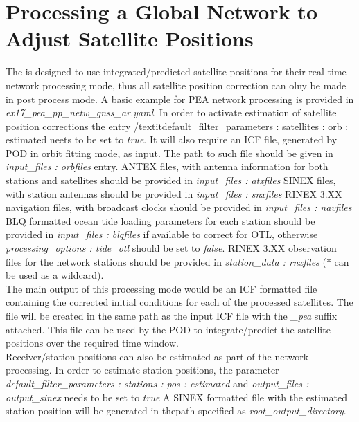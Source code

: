 \section{Processing a Global Network to Adjust Satellite Positions}
The is designed to use integrated/predicted satellite positions for their real-time network  processing mode, thus all satellite position correction can olny be made in post process mode.
A basic example for PEA network processing is provided in  \textit{ex17\_pea\_pp\_netw\_gnss\_ar.yaml}. 
In order to activate estimation of satellite position corrections the entry /textit{default\_filter\_parameters : satellites : orb : estimated} neets to be set to \textit{true}.
It will also require an ICF file, generated by POD in orbit fitting mode, as input. The path to such file should be given in \textit{input\_files : orbfiles} entry.
ANTEX files, with antenna information for both stations and satellites should be provided in  \textit{input\_files : atxfiles} 
SINEX files, with station antennas should be provided in  \textit{input\_files : snxfiles}
RINEX 3.XX navigation files, with broadcast clocks should be provided in  \textit{input\_files : navfiles}
BLQ formatted ocean tide  loading parameters for each station   should be provided in \textit{input\_files : blqfiles} if available to correct for OTL, otherwise \textit{processing\_options : tide\_otl} should be set to \textit{false}.
RINEX 3.XX observation files for the network stations should be provided in \textit{station\_data : rnxfiles} (* can be used as a wildcard).\\

The main output of this processing mode would be an ICF formatted file containing the corrected initial conditions for each of the processed satellites. 
The file will be created in the same path as the input ICF file with the \textit{\_pea} suffix attached. 
This file can be used by the POD to integrate/predict the satellite positions over the required time window.\\

Receiver/station positions can also be estimated as part of the network processing. 
In order to estimate station positions, the parameter \textit{default\_filter\_parameters : stations : pos : estimated} and \textit{output\_files : output\_sinex} needs to be set to \textit{true}
A SINEX formatted file with the estimated station position will be generated in thepath specified as \textit{root\_output\_directory}.\\

